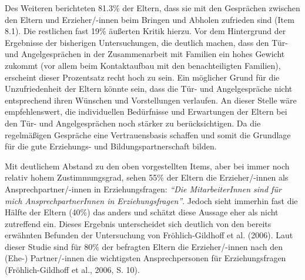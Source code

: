 \documentclass[12pt,a4paper]{article}
\begin{document}
	Des Weiteren berichteten 81.3\% der Eltern, dass sie mit den Gesprächen zwischen den Eltern und Erzieher/-innen beim Bringen und Abholen zufrieden sind (Item 8.1). Die restlichen fast 19\% äußerten Kritik hierzu. Vor dem Hintergrund der Ergebnisse der bisherigen Untersuchungen, die deutlich machen, dass den Tür- und Angelgesprächen in der Zusammenarbeit mit Familien ein hohes Gewicht zukommt (vor allem beim Kontaktaufbau mit den benachteiligten Familien), erscheint dieser Prozentsatz recht hoch zu sein. Ein möglicher Grund für die Unzufriedenheit der Eltern könnte sein, dass die Tür- und Angelgespräche nicht entsprechend ihren Wünschen und Vorstellungen verlaufen. An dieser Stelle wäre empfehlenswert, die individuellen Bedürfnisse und Erwartungen der Eltern bei den Tür- und Angelgesprächen noch stärker zu berücksichtigen. Da die regelmäßigen Gespräche eine Vertrauensbasis schaffen und somit die Grundlage für die gute Erziehungs- und Bildungspartnerschaft bilden.
	
Mit deutlichem Abstand zu den oben vorgestellten Items, aber bei immer noch relativ hohem Zustimmungsgrad, sehen 55\% der Eltern die Erzieher/-innen als Ansprechpartner/-innen in Erziehungsfragen: \textit{"`Die MitarbeiterInnen sind für mich AnsprechpartnerInnen in Erziehungsfragen"'}. Jedoch sieht immerhin fast die Hälfte der Eltern (40\%) das anders und schätzt diese Aussage eher als nicht zutreffend ein. Dieses Ergebnis unterscheidet sich deutlich von den bereits erwähnten Befunden der Untersuchung von Fröhlich-Gildhoff et al. (2006). Laut dieser Studie sind für 80\% der befragten Eltern die Erzieher/-innen nach den (Ehe-) Partner/-innen die wichtigsten Ansprechpersonen für Erziehungsfragen (Fröhlich-Gildhoff et al., 2006, S. 10).  
\end{document}
